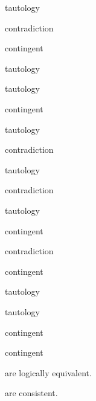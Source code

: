 \begin{earg}
\item tautology
\item contradiction
\item contingent
\item tautology
\item tautology
\item contingent
\item tautology
\item contradiction
\item tautology
\item contradiction
\item tautology
\item contingent
\item contradiction
\item contingent
\item tautology
\item tautology
\item contingent
\item contingent
\end{earg}



\noSeq%
\nextSeq%
\nextSeq%
\noSeq%
\nextSeq%
\nextSeq%
\noSeq%
\nextSeq%
\lastSeq%
are logically equivalent.




\nextSeq
\noSeq
\nextSeq
\noSeq
\noSeq
\nextSeq
\nextSeq
\lastSeq
are consistent.

